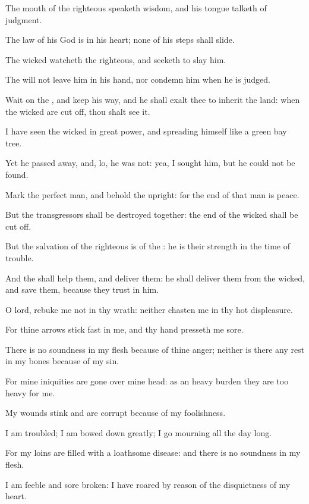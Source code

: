 \Verse The mouth of the righteous speaketh wisdom, and his tongue talketh of judgment.

\Verse The law of his God is in his heart; none of his steps shall slide.

\Verse The wicked watcheth the righteous, and seeketh to slay him.

\Verse The \LORD will not leave him in his hand, nor condemn him when he is judged.

\Verse Wait on the \LORD, and keep his way, and he shall exalt thee to inherit the land: when the wicked are cut off, thou shalt see it.

\Verse I have seen the wicked in great power, and spreading himself like a green bay tree.

\Verse Yet he passed away, and, lo, he was not: yea, I sought him, but he could not be found.

\Verse Mark the perfect man, and behold the upright: for the end of that man is peace.

\Verse But the transgressors shall be destroyed together: the end of the wicked shall be cut off.

\Verse But the salvation of the righteous is of the \LORD: he is their strength in the time of trouble.

\Verse And the \LORD shall help them, and deliver them: he shall deliver them from the wicked, and save them, because they trust in him.




\Chapter
\Verse O lord, rebuke me not in thy wrath: neither chasten me in thy hot displeasure.

\Verse For thine arrows stick fast in me, and thy hand presseth me sore.

\Verse There is no soundness in my flesh because of thine anger; neither is there any rest in my bones because of my sin.

\Verse For mine iniquities are gone over mine head: as an heavy burden they are too heavy for me.

\Verse My wounds stink and are corrupt because of my foolishness.

\Verse I am troubled; I am bowed down greatly; I go mourning all the day long.

\Verse For my loins are filled with a loathsome disease: and there is no soundness in my flesh.

\Verse I am feeble and sore broken: I have roared by reason of the disquietness of my heart.

